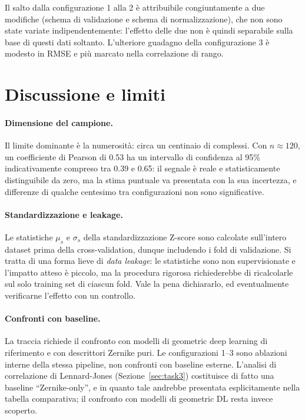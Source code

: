 \documentclass[11pt,a4paper]{article}
\begin{document}
Il salto dalla configurazione 1 alla 2 è attribuibile congiuntamente a due modifiche (schema di validazione e schema di normalizzazione), che non sono state variate indipendentemente: l'effetto delle due non è quindi separabile sulla base di questi dati soltanto. L'ulteriore guadagno della configurazione 3 è modesto in RMSE e più marcato nella correlazione di rango.

\section{Discussione e limiti}
\label{sec:discussione}

\paragraph{Dimensione del campione.} Il limite dominante è la numerosità: circa un centinaio di complessi. Con $n \approx 120$, un coefficiente di Pearson di 0.53 ha un intervallo di confidenza al 95\% indicativamente compreso tra 0.39 e 0.65: il segnale è reale e statisticamente distinguibile da zero, ma la stima puntuale va presentata con la sua incertezza, e differenze di qualche centesimo tra configurazioni non sono significative.

\paragraph{Standardizzazione e leakage.} Le statistiche $\mu_s$ e $\sigma_s$ della standardizzazione Z-score sono calcolate sull'intero dataset prima della cross-validation, dunque includendo i fold di validazione. Si tratta di una forma lieve di \emph{data leakage}: le statistiche sono non supervisionate e l'impatto atteso è piccolo, ma la procedura rigorosa richiederebbe di ricalcolarle sul solo training set di ciascun fold. Vale la pena dichiararlo, ed eventualmente verificarne l'effetto con un controllo.

\paragraph{Confronti con baseline.} La traccia richiede il confronto con modelli di geometric deep learning di riferimento e con descrittori Zernike puri. Le configurazioni 1--3 sono ablazioni interne della stessa pipeline, non confronti con baseline esterne. L'analisi di correlazione di Lennard-Jones (Sezione~\ref{sec:task3}) costituisce di fatto una baseline ``Zernike-only'', e in quanto tale andrebbe presentata esplicitamente nella tabella comparativa; il confronto con modelli di geometric DL resta invece scoperto.
\end{document}
